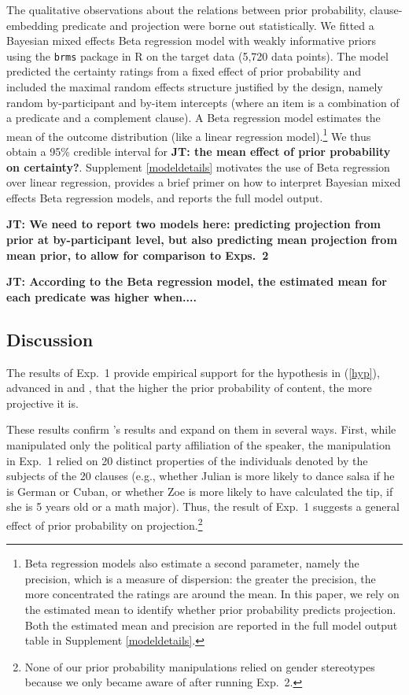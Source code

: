 \documentclass[11pt,fleqn]{article}
\newcommand{\6}{\mbox{$[\hspace*{-.6mm}[$}}
\newcommand{\9}{\mbox{$]\hspace*{-.6mm}]$}}
\newcommand{\citepos}[1]{\citeauthor{#1}'s \citeyear{#1}}
\newcommand{\jt}[1]{\textbf{\color{blue}JT: #1}}
\begin{document}
\newpage

The qualitative observations about the relations between prior probability, clause-embedding predicate and projection were borne out statistically. We fitted a Bayesian mixed effects Beta regression model  with weakly informative priors using the \verb|brms| \citep{buerkner2017}  package in R \citep{R} on the target data (5,720 data points). The model predicted the certainty ratings from a fixed effect of prior probability and included the maximal random effects structure justified by the design, namely random by-participant and by-item intercepts (where an item is a combination of a predicate and a complement clause). A Beta regression model estimates the mean of the outcome distribution (like a linear regression model).\footnote{Beta regression models also estimate a second parameter, namely the precision, which is a measure of dispersion: the greater the precision, the more concentrated the ratings are around the mean. In this paper, we rely on the estimated mean to identify whether prior probability predicts projection. Both the estimated mean and precision are reported in the full model output table in Supplement \ref{modeldetails}.} We thus obtain a 95\% credible interval for \jt{the mean effect of prior probability on certainty?}. Supplement \ref{modeldetails} motivates the use of Beta regression over linear regression, provides a brief primer on how to interpret Bayesian mixed effects Beta regression models, and reports the full model output.

\jt{We need to report two models here: predicting projection from prior at by-participant level, but also predicting mean projection from mean prior, to allow for comparison to Exps.~2}

\jt{According to the Beta regression model, the estimated mean for each predicate was higher when....} 

\subsection{Discussion}

The results of Exp.~1 provide empirical support for the hypothesis in (\ref{hyp}), advanced in \citealt{stevens-etal2017} and \citealt{tbd-variability}, that the higher the prior probability of content, the more projective it is. 

These results confirm \citepos{mahler2020} results and expand on them in several ways. First, while \citealt{mahler2020} manipulated only the political party affiliation of the speaker, the manipulation in Exp.~1 relied on 20 distinct properties of the individuals denoted by the subjects of the 20 clauses (e.g., whether Julian is more likely to dance salsa if he is German or Cuban, or whether Zoe is more likely to have calculated the tip, if she is 5 years old or a math major). Thus, the result of Exp.~1 suggests a general effect of prior probability on projection.\footnote{None of our prior probability manipulations relied on gender stereotypes because we only became aware of \citealt{lorson2018} after running Exp.~2.}
\end{document}
